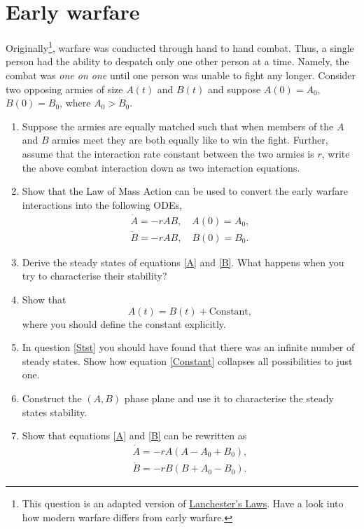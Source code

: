 \documentclass[10pt]{article}
\newcommand{\bb}{\begin{equation}}
\newcommand{\ee}{\end{equation}}
\newcommand{\eqn}[1]{equation \eqref{#1}}
\newcommand{\eqns}[2]{equations \eqref{#1} and \eqref{#2}}
\begin{document}
\section{Early warfare}\label{Early warfare}
Originally\footnote{This question is an adapted version of \href{https://en.wikipedia.org/wiki/Lanchester's_laws}{Lanchester's Laws}. Have a look into how modern warfare differs from early warfare.}, warfare was conducted through hand to hand combat. Thus, a single person had the ability to despatch only one other person at a time. Namely, the combat was \textit{one on one} until one person was unable to fight any longer. Consider two opposing armies of size $A(t)$ and $B(t)$ and suppose $A(0)=A_0$, $B(0)=B_0$, where $A_0>B_0$.
\begin{enumerate}

\item Suppose the armies are equally matched such that when members of the $A$ and $B$ armies meet they are both equally like to win the fight. Further, assume that the interaction rate constant between the two armies is $r$, write the above combat interaction down as two interaction equations.

\item Show that the Law of Mass Action can be used to convert the early warfare interactions into the following ODEs,
\begin{align}
\dot{A}=-rAB,\quad A(0)=A_0,\label{A}\\
\dot{B}=-rAB,\quad B(0)=B_0.\label{B}
\end{align}

\item \label{Stst}Derive the steady states of \eqns{A}{B}. What happens when you try to characterise their stability?

\item Show that
\bb
A(t)=B(t)+\textrm{Constant},\label{Constant}
\ee
where you should define the constant explicitly.

\item In question \ref{Stst} you should have found that there was an infinite number of steady states. Show how \eqn{Constant} collapses all possibilities to just one.

\item Construct the $(A,B)$ phase plane and use it to characterise the steady states stability.\label{Ppq}

\item Show that \eqns{A}{B} can be rewritten as
\begin{align}
\dot{A}=-rA(A-A_0+B_0),\label{AA}\\
\dot{B}=-rB(B+A_0-B_0).\label{BB}
\end{align}


\end{enumerate}
\end{document}
